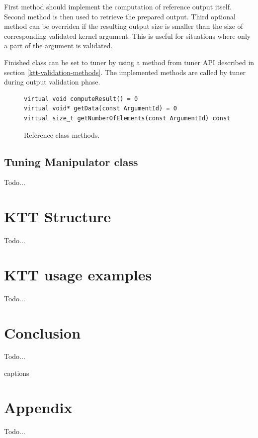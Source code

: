 \documentclass
[
    digital, %
    oneside, %
    table, %
    nolof, %
    nolot, %
    nocover %
]{fithesis3}
\begin{document}
First method should implement the computation of reference output itself. Second method is then used to retrieve the prepared output. Third optional
method can be overriden if the resulting output size is smaller than the size of corresponding validated kernel argument. This is useful for situations
where only a part of the argument is validated.

Finished class can be set to tuner by using a method from tuner API described in section \ref{ktt-validation-methods}. The implemented methods are
called by tuner during output validation phase.

\begin{figure}
\begin{lstlisting}
virtual void computeResult() = 0
virtual void* getData(const ArgumentId) = 0
virtual size_t getNumberOfElements(const ArgumentId) const
\end{lstlisting}
\caption{Reference class methods.}
\label{ktt-reference-methods}
\end{figure}

\section{Tuning Manipulator class}
Todo...

\chapter{KTT Structure}
\label{ktt-structure}
Todo...

\chapter{KTT usage examples}
\label{ktt-usage}
Todo...

\chapter{Conclusion}
Todo...

\csname captions\languagename\endcsname
\makeatletter
\thesis@selectLocale{\thesis@locale}\makeatother
\printbibliography[heading=bibintoc]

\appendix
\chapter{Appendix}
Todo...
\end{document}

